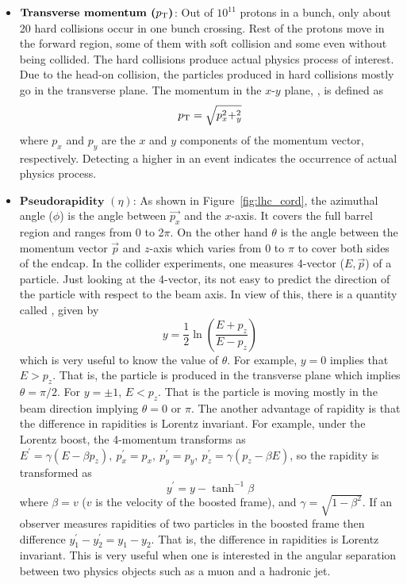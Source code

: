 \begin{itemize}[leftmargin=*]
\item $\textbf{Transverse momentum (\ensuremath{p_{\mathrm{T}}})}$: 
	Out of $10^{11}$ protons in a bunch, only about 20 hard collisions occur 
	in one bunch crossing. Rest of the protons move in the forward region, some of 
	them with soft collision and some even without being collided. The hard 
	collisions produce actual physics process of interest. Due to the head-on 
	collision, the particles produced in hard collisions mostly go in the transverse 
	plane. The momentum in the $x$-$y$ plane, \pt, is defined as
	\begin{equation}
		p_{\mathrm{T}} = \sqrt{p_x^2 + _y^2}
	\end{equation}
	where $p_x$ and $p_y$ are the $x$ and $y$ components of the momentum vector, respectively. 
	Detecting a higher \pt in an event indicates the occurrence of actual physics process.
\item $\textbf{Pseudorapidity $(\eta)$}$: As shown in Figure~\ref{fig:lhc_cord}, 
	the azimuthal angle ($\phi$) is the angle between $\vec{p_x}$ and the $x$-axis. 
	It covers the full barrel region and ranges from 0 to 2$\pi$. On the other hand $\theta$ 
	is the angle between the momentum vector $\vec{p}$ and $z$-axis which varies from 0 to 
	$\pi$ to cover both sides of the endcap. 
	In the collider experiments, one measures 4-vector ($E, \vec{p}$) of a 
	particle. Just looking at the 4-vector, its not easy to predict the direction
	of the particle with respect to the beam axis. In view of this, there is a quantity 
	called , given by \cite{EDaw}
	\begin{equation}
		y = \frac{1}{2}\ln\left(\frac{E+p_z}{E-p_z}\right)
	\label{eq:lhc_y}
	\end{equation}
	which is very useful to know the value of $\theta$. For example, $y = 0$ implies 
	that $E > p_z$. That is, the particle is produced in the transverse plane which
	implies $\theta = \pi/2$. For $y = \pm 1$, $E<p_z$. That is the particle is
	moving mostly in the beam direction implying $\theta = 0$ or $\pi$. The
	another advantage of rapidity is that the difference in rapidities is Lorentz 
	invariant. For example, under the Lorentz boost, the 4-momentum transforms as 
	$E^\prime = \gamma (E-\beta p_z) , ~p^\prime_x = p_x, ~p^\prime_y = p_y, ~p^\prime_z = \gamma(p_z - \beta E)$, so the rapidity is transformed as
	\begin{equation}
		y^\prime = y - \tanh^{-1}\beta
	\end{equation}
	where $\beta = v$ ($v$ is the velocity of the boosted frame), and 
	$\gamma = \sqrt{1-\beta^2}$. If an observer measures rapidities of two particles
	in the boosted frame then difference $y_1^\prime -y_2^\prime = y_1 - y_2$.
	That is, the difference in rapidities is Lorentz invariant. This is very useful
	when one is interested in the angular separation between two physics objects such
	as a muon and a hadronic jet.


\end{itemize}
